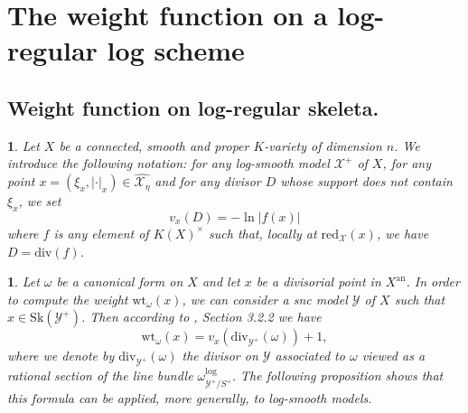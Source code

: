 \documentclass{amsart}%
\numberwithin{equation}{subsection}
\theoremstyle{plain2}
\newtheorem{prop}[equation]{Proposition}
\theoremstyle{definition2}
\theoremstyle{stepstyle}
\theoremstyle{point}
\theoremstyle{subpoint}
\newtheorem{subpoint}[equation]{}%
\newcommand{\spa}[1]{\begin{subpoint}#1\end{subpoint}}           %
\newcommand{\N}{\ensuremath{\mathbb{N}}}
\newcommand{\cX}{\ensuremath{\mathscr{X}}}
\newcommand{\caC}{\ensuremath{\mathcal{C}}}
\newcommand{\cY}{\ensuremath{\mathscr{Y}}}
\newcommand{\cZ}{\ensuremath{\mathscr{Z}}}
\renewcommand{\cZ}{\ensuremath{\mathscr{Z}}}
\renewcommand{\cY}{\ensuremath{\mathscr{Y}}}
\newcommand{\redu}{\mathrm{red}}
\newcommand{\divisor}{\mathrm{div}}
\newcommand{\weight}{\mathrm{wt}}
\newcommand{\Sk}{\mathrm{Sk}}
\begin{document}
%


\section{The weight function on a log-regular log scheme} \label{sect wt log}
\subsection{Weight function on log-regular skeleta.}
\spa{Let $X$ be a connected, smooth and proper $K$-variety of dimension $n$. We introduce the following notation: for any log-smooth model $\cX^+$ of $X$, for any point $x = (\xi_x,|\cdot|_x) \in \widehat{\cX_{\eta}}$ and for any divisor $D$ whose support does not contain $\xi_x$, we set $$v_x(D) = - \ln |f(x)|$$ where $f$ is any element of $K(X)^\times$ such that, locally at $\redu_{\cX}(x)$, we have $D= \divisor(f)$.}

\spa{Let $\omega$ be a canonical form on $X$ and let $x$ be a divisorial point in $X^{\text{an}}$. In order to compute the weight $\weight_{\omega}(x)$, we can consider a snc model $\cY$ of $X$ such that $x \in \Sk(\cY^+)$. Then according to \cite{NicaiseXu}, Section 3.2.2 we have \begin{equation} \label{equ def weight function}
\weight_{\omega}(x)=v_x(\divisor_{\cY^+}(\omega)) +1,
\end{equation} where we denote by $\divisor_{\cY^+}(\omega)$ the divisor on $\cY$ associated to $\omega$ viewed as a rational section of the line bundle $\omega_{\cY^+/ S^+}^{\text{log}}.$
The following proposition shows that this formula can be applied, more generally, to log-smooth models.}
\end{document}
